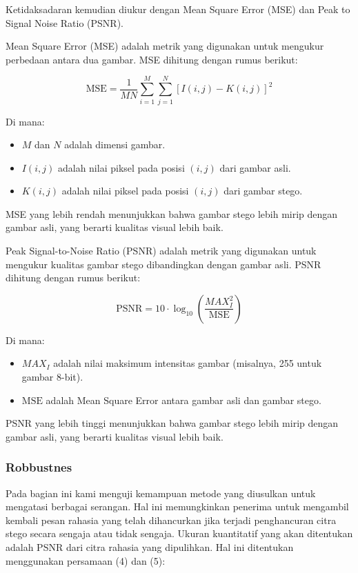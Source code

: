 \documentclass{ittelkom}
\begin{document}
Ketidaksadaran kemudian diukur dengan Mean Square Error (MSE) dan Peak to
Signal Noise Ratio (PSNR).

Mean Square Error (MSE) adalah metrik yang digunakan untuk mengukur perbedaan
antara dua gambar. MSE dihitung dengan rumus berikut:

\begin{equation}
    \text{MSE} = \frac{1}{MN} \sum_{i=1}^{M} \sum_{j=1}^{N} [I(i,j) - K(i,j)]^2
\end{equation}

Di mana:
\begin{itemize}
    \item $M$ dan $N$ adalah dimensi gambar.
    \item $I(i,j)$ adalah nilai piksel pada posisi $(i,j)$ dari gambar asli.
    \item $K(i,j)$ adalah nilai piksel pada posisi $(i,j)$ dari gambar stego.
\end{itemize}

MSE yang lebih rendah menunjukkan bahwa gambar stego lebih mirip dengan gambar
asli, yang berarti kualitas visual lebih baik.

Peak Signal-to-Noise Ratio (PSNR) adalah metrik yang digunakan untuk mengukur
kualitas gambar stego dibandingkan dengan gambar asli. PSNR dihitung dengan
rumus berikut:

\begin{equation}
    \text{PSNR} = 10 \cdot \log_{10} \left( \frac{MAX_I^2}{\text{MSE}} \right)
\end{equation}

Di mana:
\begin{itemize}
    \item $MAX_I$ adalah nilai maksimum intensitas gambar (misalnya, 255 untuk gambar 8-bit).
    \item $\text{MSE}$ adalah Mean Square Error antara gambar asli dan gambar stego.
\end{itemize}

PSNR yang lebih tinggi menunjukkan bahwa gambar stego lebih mirip dengan gambar
asli, yang berarti kualitas visual lebih baik.

\subsubsection{Robbustnes}

Pada bagian ini kami menguji kemampuan metode yang diusulkan untuk mengatasi
berbagai serangan. Hal ini memungkinkan penerima untuk mengambil kembali pesan
rahasia yang telah dihancurkan jika terjadi penghancuran citra stego secara
sengaja atau tidak sengaja. Ukuran kuantitatif yang akan ditentukan adalah PSNR
dari citra rahasia yang dipulihkan. Hal ini ditentukan menggunakan persamaan
(4) dan (5):
\end{document}
